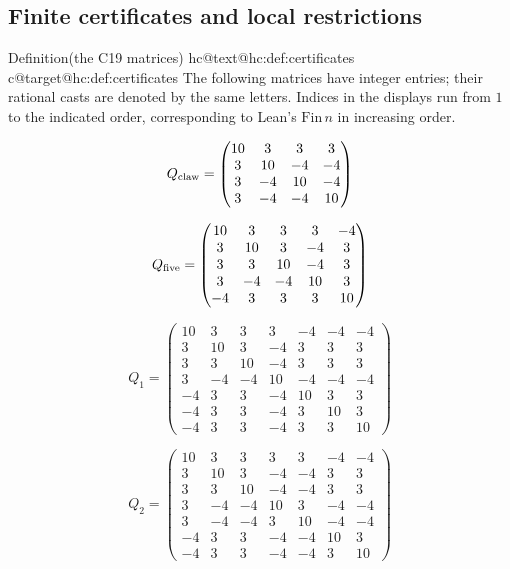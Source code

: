 \documentclass[11pt]{amsart}
\makeatletter
\let\hcSavedLabel\label
\renewcommand{\label}[1]{%
  \hcSavedLabel{#1}%
  \expandafter\protected@xdef\csname hc@text@#1\endcsname{\@currentlabel}%
  \expandafter\xdef\csname hc@target@#1\endcsname{\@currentHref}}
\makeatother
\begin{document}
\subsection{Finite certificates and local restrictions}

\begin{namedresult}{Definition}{(the C19 matrices)}\label{hc:def:certificates}
 \uses{}
 The following matrices have integer entries; their rational casts
 are denoted by the same letters. Indices in the displays run from
 $1$ to the indicated order, corresponding to Lean's
 $\mathrm{Fin}\,n$ in increasing order.

\[
 Q_{\rm claw}=
 \begin{pmatrix}
 10&3&3&3\\3&10&-4&-4\\3&-4&10&-4\\3&-4&-4&10
 \end{pmatrix}
\]

\[
 Q_{\rm five}=
 \begin{pmatrix}
 10&3&3&3&-4\\3&10&3&-4&3\\3&3&10&-4&3\\
 3&-4&-4&10&3\\-4&3&3&3&10
 \end{pmatrix}
\]

\[
 Q_1=
 \begin{pmatrix}
 10&3&3&3&-4&-4&-4\\
 3&10&3&-4&3&3&3\\
 3&3&10&-4&3&3&3\\
 3&-4&-4&10&-4&-4&-4\\
 -4&3&3&-4&10&3&3\\
 -4&3&3&-4&3&10&3\\
 -4&3&3&-4&3&3&10
 \end{pmatrix}
\]

\[
 Q_2=
 \begin{pmatrix}
 10&3&3&3&3&-4&-4\\
 3&10&3&-4&-4&3&3\\
 3&3&10&-4&-4&3&3\\
 3&-4&-4&10&3&-4&-4\\
 3&-4&-4&3&10&-4&-4\\
 -4&3&3&-4&-4&10&3\\
 -4&3&3&-4&-4&3&10
 \end{pmatrix}
\]


\end{namedresult}
\end{document}
